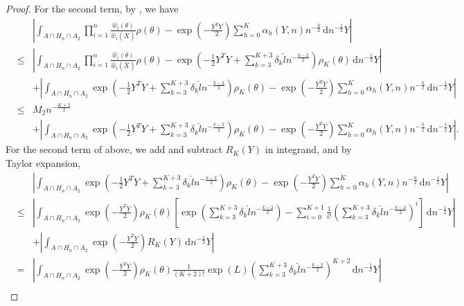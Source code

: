\documentclass[oneside,english]{amsbook}
\numberwithin{section}{chapter}
\numberwithin{equation}{section}
\numberwithin{figure}{section}
\theoremstyle{plain}
\theoremstyle{plain}
\theoremstyle{definition}
\theoremstyle{plain}
\theoremstyle{plain}
\theoremstyle{remark}
\theoremstyle{definition}
\theoremstyle{definition}
\newcommand{\diff}{\,\mathrm{d}}
\begin{document}
\begin{proof}
For the second term, by , we
have 
\begin{eqnarray*}
 &  & \left|\int_{A\cap H_{n}\cap A_{2}}\prod_{i=1}^{n}\frac{\hat{w}_{i}\left(\theta\right)}{\hat{w}_{i}\left(\overline{X}\right)}\rho\left(\theta\right)-\exp\left(-\frac{Y^{T}Y}{2}\right)\sum_{h=0}^{K}\alpha_{h}\left(Y,n\right)n^{-\frac{h}{2}}\diff n^{-\frac{1}{2}}Y\right|\\
 & \le & \left|\int_{A\cap H_{n}\cap A_{2}}\prod_{i=1}^{n}\frac{\hat{w}_{i}\left(\theta\right)}{\hat{w}_{i}\left(\overline{X}\right)}\rho\left(\theta\right)-\exp\left(-\frac{1}{2}Y^{T}Y+\sum_{k=3}^{K+3}\delta_{k}\hat{l}n^{-\frac{k-2}{2}}\right)\rho_{K}\left(\theta\right)\diff n^{-\frac{1}{2}}Y\right|\\
 &  & +\left|\int_{A\cap H_{n}\cap A_{2}}\exp\left(-\frac{1}{2}Y^{T}Y+\sum_{k=3}^{K+3}\delta_{k}\hat{l}n^{-\frac{k-2}{2}}\right)\rho_{K}\left(\theta\right)-\exp\left(-\frac{Y^{T}Y}{2}\right)\sum_{h=0}^{K}\alpha_{h}\left(Y,n\right)n^{-\frac{h}{2}}\diff n^{-\frac{1}{2}}Y\right|\\
 & \le & M_{2}n^{-\frac{K+2}{2}}\\
 &  & +\left|\int_{A\cap H_{n}\cap A_{2}}\exp\left(-\frac{1}{2}Y^{T}Y+\sum_{k=3}^{K+3}\delta_{k}\hat{l}n^{-\frac{k-2}{2}}\right)\rho_{K}\left(\theta\right)-\exp\left(-\frac{Y^{T}Y}{2}\right)\sum_{h=0}^{K}\alpha_{h}\left(Y,n\right)n^{-\frac{h}{2}}\diff n^{-\frac{1}{2}}Y\right|.
\end{eqnarray*}
For the second term of above, we add and subtract $R_{K}\left(Y\right)$
in integrand, and by Taylor expansion, 
\begin{eqnarray*}
 &  & \left|\int_{A\cap H_{n}\cap A_{2}}\exp\left(-\frac{1}{2}Y^{T}Y+\sum_{k=3}^{K+3}\delta_{k}\hat{l}n^{-\frac{k-2}{2}}\right)\rho_{K}\left(\theta\right)-\exp\left(-\frac{Y^{T}Y}{2}\right)\sum_{h=0}^{K}\alpha_{h}\left(Y,n\right)n^{-\frac{h}{2}}\diff n^{-\frac{1}{2}}Y\right|\\
 & \le & \left|\int_{A\cap H_{n}\cap A_{2}}\exp\left(-\frac{Y^{T}Y}{2}\right)\rho_{K}\left(\theta\right)\left[\exp\left(\sum_{k=3}^{K+3}\delta_{k}\hat{l}n^{-\frac{k-2}{2}}\right)-\sum_{i=0}^{K+1}\frac{1}{i!}\left(\sum_{k=3}^{K+3}\delta_{k}\hat{l}n^{-\frac{k-2}{2}}\right)^{i}\right]\diff n^{-\frac{1}{2}}Y\right|\\
 &  & +\left|\int_{A\cap H_{n}\cap A_{2}}\exp\left(-\frac{Y^{T}Y}{2}\right)R_{K}\left(Y\right)\diff n^{-\frac{1}{2}}Y\right|\\
 & = & \left|\int_{A\cap H_{n}\cap A_{2}}\exp\left(-\frac{Y^{T}Y}{2}\right)\rho_{K}\left(\theta\right)\frac{1}{\left(K+2\right)!}\exp\left(L\right)\left(\sum_{k=3}^{K+3}\delta_{k}\hat{l}n^{-\frac{k-2}{2}}\right)^{K+2}\diff n^{-\frac{1}{2}}Y\right|\\

\end{eqnarray*}
\end{proof}
\end{document}
